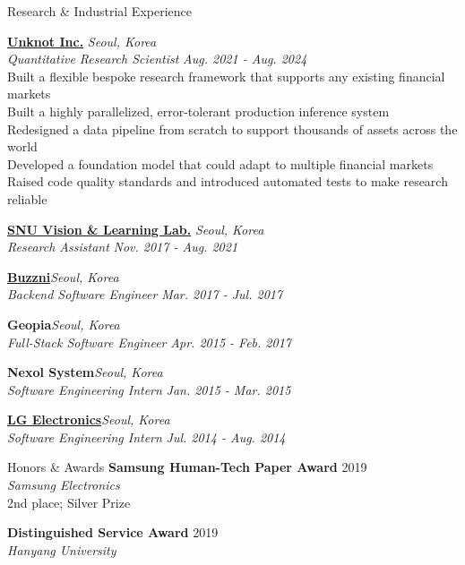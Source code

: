 \documentclass{resume} %
\begin{document}
\begin{rSection}{Research \& Industrial Experience}

{\bf {\href{https://www.linkedin.com/company/unknot-inc/}{Unknot Inc.}}} \hfill{\em Seoul, Korea}\\
\textit{Quantitative Research Scientist} \hfill{\em Aug. 2021 - Aug. 2024}\\
{\small Built a flexible bespoke research framework that supports any existing financial markets}\\
{\small Built a highly parallelized, error-tolerant production inference system}\\
{\small Redesigned a data pipeline from scratch to support thousands of assets across the world}\\
{\small Developed a foundation model that could adapt to multiple financial markets}\\
{\small Raised code quality standards and introduced automated tests to make research reliable}

{\bf \href{https://vision.snu.ac.kr/}{SNU Vision \& Learning Lab.}} \hfill{\em Seoul, Korea} \\
\textit{Research Assistant} \hfill{\em Nov. 2017 - Aug. 2021}

{\bf \href{https://www.buzzni.com/}{Buzzni}}\hfill{\em Seoul, Korea} \\
\textit{Backend Software Engineer} \hfill{\em Mar. 2017 - Jul. 2017}

{\bf Geopia}\hfill{\em Seoul, Korea}\\
\textit{Full-Stack Software Engineer} \hfill{\em Apr. 2015 - Feb. 2017}

{\bf Nexol System}\hfill{\em Seoul, Korea}\\
\textit{Software Engineering Intern} \hfill{\em Jan. 2015 - Mar. 2015}

{\bf \href{https://www.lg.com/us}{LG Electronics}}\hfill{\em Seoul, Korea}\\
\textit{Software Engineering Intern} \hfill{\em Jul. 2014 - Aug. 2014}

\end{rSection}


\begin{rSection}{Honors \& Awards}
	{\bf Samsung Human-Tech Paper Award} \hfill{2019}\\
	\textit{Samsung Electronics}\\
	2nd place; Silver Prize
	
	{\bf Distinguished Service Award} \hfill{2019}\\
	\textit{Hanyang University}
\end{rSection}
\end{document}
